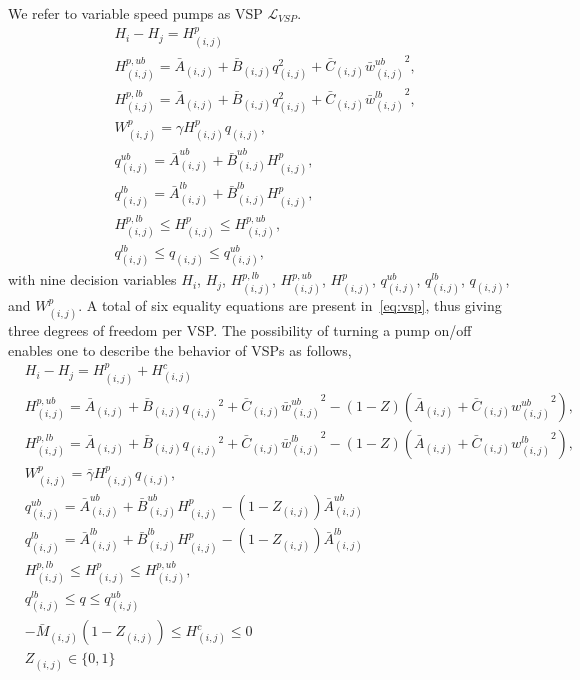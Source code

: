 \par We refer to variable speed pumps as VSP $\mathcal{L}_{VSP}$.
\begin{subequations}\label{eq:vsp}
    \begin{alignat}{2}
        & H_i - H_j = H^p_{(i,j)}
        \\
        & H^{p,ub}_{(i,j)} = \bar{A}_{(i,j)} + \bar{B}_{(i,j)} q_{(i,j)}^2 + \bar{C}_{(i,j)} {\bar{w}_{(i,j)}^{ub}}^2,
        \\
        & H^{p,lb}_{(i,j)} = \bar{A}_{(i,j)} + \bar{B}_{(i,j)} q_{(i,j)}^2 + \bar{C}_{(i,j)} {\bar{w}_{(i,j)}^{lb}}^2,
        \\
        & W^p_{(i,j)} = \gamma H^p_{(i,j)} q_{(i,j)},
        \\
        & q^{ub}_{(i,j)} = \bar{A}^{ub}_{(i,j)} + \bar{B}^{ub}_{(i,j)} H^p_{(i,j)},
        \\
        & q^{lb}_{(i,j)} = \bar{A}^{lb}_{(i,j)} + \bar{B}^{lb}_{(i,j)} H^p_{(i,j)},
        \\
        & H^{p,lb}_{(i,j)} \leq H^p_{(i,j)} \leq H^{p,ub}_{(i,j)},
        \\
        & q^{lb}_{(i,j)} \leq q_{(i,j)} \leq q^{ub}_{(i,j)},
    \end{alignat}
\end{subequations}
with nine decision variables $H_i$, $H_j$, $H^{p,lb}_{(i,j)}$, $H^{p,ub}_{(i,j)}$, $H^p_{(i,j)}$, $q^{ub}_{(i,j)}$, $q^{lb}_{(i,j)}$, $q_{(i,j)}$, and $W^p_{(i,j)}$. A total of six equality equations are present in~\eqref{eq:vsp}, thus giving three degrees of freedom per VSP\@. The possibility of turning a pump on/off enables one to describe the behavior of VSPs as follows,
\begin{subequations} \label{eq:VSP_int}
    \begin{alignat}{2}
        & H_i - H_j = H^p_{(i,j)} + H^c_{(i,j)}
        \\
        &H^{p,ub}_{(i,j)} = \bar{A}_{(i,j)} + \bar{B}_{(i,j)} {q_{(i,j)}}^2 + \bar{C}_{(i,j)} {\bar{w}^{ub}_{(i,j)}}^{2} - (1 - Z)(\bar{A}_{(i,j)} + \bar{C}_{(i,j)} {w_{(i,j)}^{ub}}^2),
        \\
        &H^{p,lb}_{(i,j)} = \bar{A}_{(i,j)} + \bar{B}_{(i,j)} {q_{(i,j)}}^2 + \bar{C}_{(i,j)} {\bar{w}^{lb}_{(i,j)}}^{2} - (1 - Z)(\bar{A}_{(i,j)} + \bar{C}_{(i,j)} {w_{(i,j)}^{lb}}^2),
        \\
        & W^p_{(i,j)} = \bar{\gamma} H^p_{(i,j)} q_{(i,j)},
        \\
        &  q^{ub}_{(i,j)} = \bar{A}^{ub}_{(i,j)} + \bar{B}^{ub}_{(i,j)} H^p_{(i,j)} - (1 - Z_{(i,j)}) \bar{A}^{ub}_{(i,j)}
        \\
        &  q^{lb}_{(i,j)} = \bar{A}^{lb}_{(i,j)} + \bar{B}^{lb}_{(i,j)} H^p_{(i,j)} - (1 - Z_{(i,j)}) \bar{A}^{lb}_{(i,j)}
        \\
        & H^{p,lb}_{(i,j)} \leq H^{p}_{(i,j)} \leq H^{p,ub}_{(i,j)},
        \\
        & q^{lb}_{(i,j)} \leq q \leq q^{ub}_{(i,j)}
        \\
        & -\bar M_{(i,j)} (1 - Z_{(i,j)}) \leq H^c_{(i,j)} \leq 0
        \\
        &Z_{(i,j)} \in \{0,1\}
    \end{alignat}
\end{subequations}
